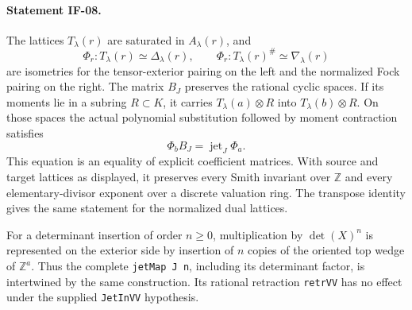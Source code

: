 \documentclass[11pt,a4paper]{article}
\theoremstyle{definition}
\theoremstyle{remark}
\begin{document}
\paragraph{Statement IF-08.}
The lattices $T_\lambda(r)$ are saturated in $A_\lambda(r)$, and
\[
 \Phi_r:T_\lambda(r)\simeq\Delta_\lambda(r),\qquad
 \Phi_r:T_\lambda(r)^\#\simeq\nabla_\lambda(r)       \tag{IF-08c}
\]
are isometries for the tensor-exterior pairing on the left and the
normalized Fock pairing on the right. The matrix $B_J$ preserves the
rational cyclic spaces. If its moments lie in a subring $R\subset K$,
it carries $T_\lambda(a)\otimes R$ into $T_\lambda(b)\otimes R$.
On those spaces the actual polynomial substitution followed by moment
contraction satisfies
\[
 \Phi_b B_J=\operatorname{jet}_J\Phi_a.             \tag{IF-08d}
\]
This equation is an equality of explicit coefficient matrices. With
source and target lattices as displayed, it preserves every
Smith invariant over $\mathbb Z$ and every elementary-divisor exponent
over a discrete valuation ring. The transpose identity gives the same
statement for the normalized dual lattices.

For a determinant insertion of order $n\geq0$, multiplication by
$\det(X)^n$ is represented on the exterior side by insertion of $n$
copies of the oriented top wedge of $\mathbb Z^a$. Thus the complete
\texttt{jetMap J n}, including its determinant factor, is intertwined
by the same construction. Its rational retraction \texttt{retrVV}
has no effect under the supplied \texttt{JetInVV} hypothesis.
\end{document}
